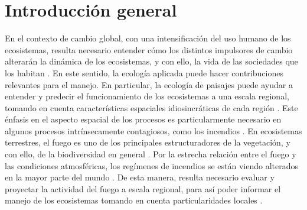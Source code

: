 \newpage{\ }
\cleardoublepage

\chapter[Capítulo 1. Introducción general]{Introducción general}\label{cap:intro}

En el contexto de cambio global, con una intensificación del uso humano de los ecosistemas, resulta necesario entender cómo los distintos impulsores de cambio alterarán la dinámica de los ecosistemas, y con ello, la vida de las sociedades que los habitan \citep{IPCC2023}. En este sentido, la ecología aplicada puede hacer contribuciones relevantes para el manejo. En particular, la ecología de paisajes puede ayudar a entender y predecir el funcionamiento de los ecosistemas a una escala regional, tomando en cuenta características espaciales idiosincráticas de cada región \citep{gergel2017learning,rego2019applied}. Este énfasis en el aspecto espacial de los procesos es particularmente necesario en algunos procesos intrínsecamente contagiosos, como los incendios \citep{keane2004classification, mckenzie2011landscape}. En ecosistemas terrestres, el fuego es uno de los principales estructuradores de la vegetación, y con ello, de la biodiversidad en general \citep{bond_global_2005, bond2005fire}. Por la estrecha relación entre el fuego y las condiciones atmosféricas, los regímenes de incendios se están viendo alterados en la mayor parte del mundo \citep{flannigan_implications_2009, flannigan_fuel_2016, ellis_global_2022}. De esta manera, resulta necesario evaluar y proyectar la actividad del fuego a escala regional, para así poder informar el manejo de los ecosistemas tomando en cuenta particularidades locales \citep{mckenzie2011landscape, moritz2012climate, bowman_vegetation_2020}. 

